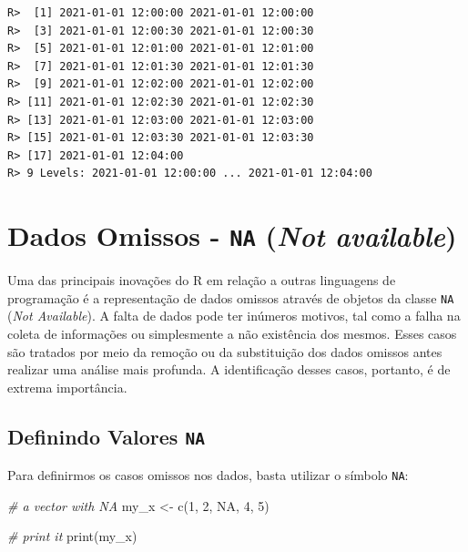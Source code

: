\documentclass[
  11pt,
]{book}
\newenvironment{Shaded}{\begin{snugshade}}{\end{snugshade}}
\newcommand{\CommentTok}[1]{\textcolor[rgb]{0.37,0.37,0.37}{\textit{#1}}}
\newcommand{\ConstantTok}[1]{\textcolor[rgb]{0,0,0}{#1}}
\newcommand{\DecValTok}[1]{\textcolor[rgb]{0.06,0.06,0.06}{#1}}
\newcommand{\FunctionTok}[1]{\textcolor[rgb]{0,0,0}{#1}}
\newcommand{\NormalTok}[1]{#1}
\newcommand{\OtherTok}[1]{\textcolor[rgb]{0.37,0.37,0.37}{#1}}
\begin{document}
\begin{verbatim}
R>  [1] 2021-01-01 12:00:00 2021-01-01 12:00:00
R>  [3] 2021-01-01 12:00:30 2021-01-01 12:00:30
R>  [5] 2021-01-01 12:01:00 2021-01-01 12:01:00
R>  [7] 2021-01-01 12:01:30 2021-01-01 12:01:30
R>  [9] 2021-01-01 12:02:00 2021-01-01 12:02:00
R> [11] 2021-01-01 12:02:30 2021-01-01 12:02:30
R> [13] 2021-01-01 12:03:00 2021-01-01 12:03:00
R> [15] 2021-01-01 12:03:30 2021-01-01 12:03:30
R> [17] 2021-01-01 12:04:00
R> 9 Levels: 2021-01-01 12:00:00 ... 2021-01-01 12:04:00
\end{verbatim}

\hypertarget{dados-omissos---na-not-available}{%
\section{\texorpdfstring{Dados Omissos - \texttt{NA} (\emph{Not available})}{Dados Omissos - NA (Not available)}}\label{dados-omissos---na-not-available}}

Uma das principais inovações do R em relação a outras linguagens de programação é a representação de dados omissos através de objetos da classe \texttt{NA} (\emph{Not Available}). A falta de dados pode ter inúmeros motivos, tal como a falha na coleta de informações ou simplesmente a não existência dos mesmos. Esses casos são tratados por meio da remoção ou da substituição dos dados omissos antes realizar uma análise mais profunda. A identificação desses casos, portanto, é de extrema importância.

\hypertarget{definindo-valores-na}{%
\subsection{\texorpdfstring{Definindo Valores \texttt{NA}}{Definindo Valores NA}}\label{definindo-valores-na}}

Para definirmos os casos omissos nos dados, basta utilizar o símbolo \texttt{NA}:

\begin{Shaded}
\begin{Highlighting}[]
\CommentTok{\# a vector with NA}
\NormalTok{my\_x }\OtherTok{\textless{}{-}} \FunctionTok{c}\NormalTok{(}\DecValTok{1}\NormalTok{, }\DecValTok{2}\NormalTok{, }\ConstantTok{NA}\NormalTok{, }\DecValTok{4}\NormalTok{, }\DecValTok{5}\NormalTok{)}

\CommentTok{\# print it}
\FunctionTok{print}\NormalTok{(my\_x)}
\end{Highlighting}
\end{Shaded}
\end{document}
